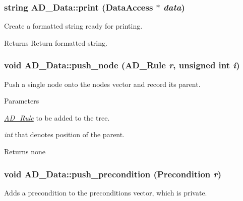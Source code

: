 \label{classAD__Data_a7c736350355a4030c96d526cbfaa6078}
\hypertarget{classAD__Data_a0fafd366f2e3244c3a1a4b21dbdca2e3}{
\subsubsection[{print}]{\setlength{\rightskip}{0pt plus 5cm}string AD\_\-Data::print ({\bf DataAccess} $\ast$ {\em data})}}
\label{classAD__Data_a0fafd366f2e3244c3a1a4b21dbdca2e3}
Create a formatted string ready for printing.

\begin{DoxyReturn}{Returns}
Return formatted string. 
\end{DoxyReturn}
\hypertarget{classAD__Data_aefd8ae5332cb9ff0014f69171deee8b6}{
\subsubsection[{push\_\-node}]{\setlength{\rightskip}{0pt plus 5cm}void AD\_\-Data::push\_\-node ({\bf AD\_\-Rule} {\em r}, \/  unsigned int {\em i})}}
\label{classAD__Data_aefd8ae5332cb9ff0014f69171deee8b6}
Push a single node onto the nodes vector and record its parent.


\begin{DoxyParams}{Parameters}
\item[{\em \hyperlink{classAD__Rule}{AD\_\-Rule}}]to be added to the tree. \item[{\em int}]that denotes position of the parent. \end{DoxyParams}
\begin{DoxyReturn}{Returns}
none 
\end{DoxyReturn}
\hypertarget{classAD__Data_a20919e580c8921096c076bb1c34ddb84}{
\subsubsection[{push\_\-precondition}]{\setlength{\rightskip}{0pt plus 5cm}void AD\_\-Data::push\_\-precondition ({\bf Precondition} {\em r})}}
\label{classAD__Data_a20919e580c8921096c076bb1c34ddb84}
Adds a precondition to the preconditions vector, which is private.


